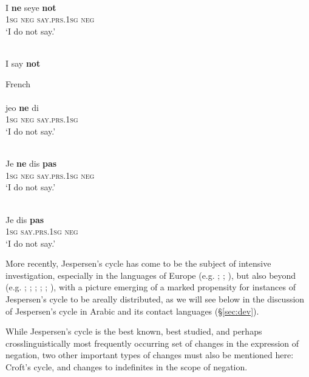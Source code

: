 \documentclass[output=paper]{langsci/langscibook}
\begin{document}
\\
\gll I \textbf{ne} seye \textbf{not}\\
     \textsc{1sg}  \textsc{neg} \textsc{\textup{say.}}\textsc{prs.1sg} \textsc{neg}  \\
\glt ‘I do not say.’


\\
 I say \textbf{not}\\
\z
\z

\ea\label{fr}
{French \citep[7]{Jespersen1917}}\\
\\
\gll jeo \textbf{ne} di\\
     \textsc{1sg} \textsc{neg} \textsc{\textup{say}}.\textsc{prs.1sg}  \\
\glt  ‘I do not say.’

\\
\gll Je \textbf{ne} dis \textbf{pas}\\
     \textsc{1sg} \textsc{neg} \textsc{\textup{say}}.\textsc{prs.1sg} \textsc{neg}  \\
\glt ‘I do not say.’

\\
\gll Je dis \textbf{pas}\\
     \textsc{1sg} \textsc{\textup{say}}.\textsc{prs.1sg} \textsc{neg}  \\
\glt ‘I do not say.’
\z
\z

More recently, Jespersen’s cycle has come to be the subject of intensive investigation, especially in the languages of Europe (e.g. \citealt{BerniniRamat1992}; \citeyear{BerniniRamat1996}; \citealt{WillisBreitbarth2013}), but also beyond (e.g. \citealt{Lucas2007}; \citeyear{Lucas2009,Lucas2013}; \citealt{LucasLash2010}; \citealt{DevosAuwera2013}; \citealt{AuweraVossen2015}; \citeyear{AuweraVossen2016,AuweraVossen2017}), with a picture emerging of a marked propensity for instances of Jespersen’s cycle to be areally distributed, as we will see below in the discussion of Jespersen’s cycle in Arabic and its contact languages (§\ref{sec:dev}).

While Jespersen’s cycle is the best known, best studied, and perhaps crosslinguistically most frequently occurring set of changes in the expression of negation, two other important types of changes must also be mentioned here: Croft’s cycle, and changes to indefinites in the scope of negation.
\end{document}

